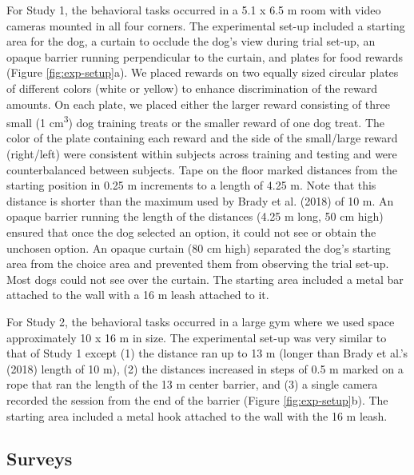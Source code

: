 \documentclass[
  pub,floatsintext]{apa6}
\begin{document}
For Study 1, the behavioral tasks occurred in a 5.1 x 6.5 m room with video cameras mounted in all four corners. The experimental set-up included a starting area for the dog, a curtain to occlude the dog's view during trial set-up, an opaque barrier running perpendicular to the curtain, and plates for food rewards (Figure \ref{fig:exp-setup}a). We placed rewards on two equally sized circular plates of different colors (white or yellow) to enhance discrimination of the reward amounts. On each plate, we placed either the larger reward consisting of three small (1 cm\textsuperscript{3}) dog training treats or the smaller reward of one dog treat. The color of the plate containing each reward and the side of the small/large reward (right/left) were consistent within subjects across training and testing and were counterbalanced between subjects. Tape on the floor marked distances from the starting position in 0.25 m increments to a length of 4.25 m. Note that this distance is shorter than the maximum used by Brady et al. (2018) of 10 m. An opaque barrier running the length of the distances (4.25 m long, 50 cm high) ensured that once the dog selected an option, it could not see or obtain the unchosen option. An opaque curtain (80 cm high) separated the dog's starting area from the choice area and prevented them from observing the trial set-up. Most dogs could not see over the curtain. The starting area included a metal bar attached to the wall with a 16 m leash attached to it.

For Study 2, the behavioral tasks occurred in a large gym where we used space approximately 10 x 16 m in size. The experimental set-up was very similar to that of Study 1 except (1) the distance ran up to 13 m (longer than Brady et al.'s (2018) length of 10 m), (2) the distances increased in steps of 0.5 m marked on a rope that ran the length of the 13 m center barrier, and (3) a single camera recorded the session from the end of the barrier (Figure \ref{fig:exp-setup}b). The starting area included a metal hook attached to the wall with the 16 m leash.

\hypertarget{surveys}{%
\subsection{Surveys}\label{surveys}}
\end{document}
